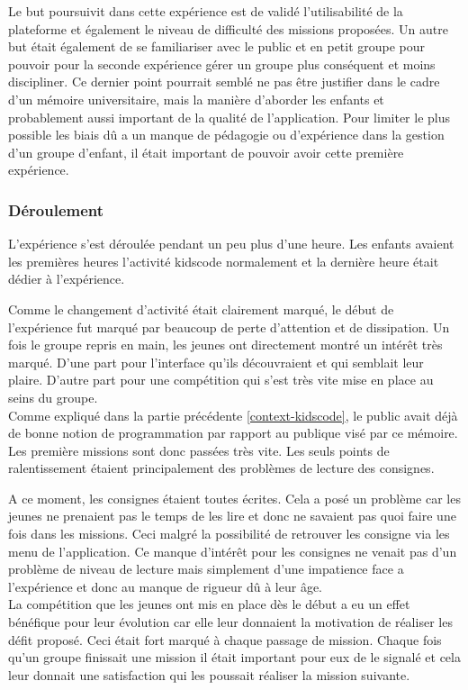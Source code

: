 Le but poursuivit dans cette expérience est de validé l'utilisabilité de la plateforme et également le niveau de difficulté des missions proposées. Un autre but était également de se familiariser avec le public et en petit groupe pour pouvoir pour la seconde expérience gérer un groupe plus conséquent et moins discipliner.
Ce dernier point pourrait semblé ne pas être justifier dans le cadre d'un mémoire universitaire, mais la manière d'aborder les enfants et probablement aussi important de la qualité de l'application. Pour limiter le plus possible les biais dû a un manque de pédagogie ou d'expérience dans la gestion d'un groupe d'enfant, il était important de pouvoir avoir cette première expérience.
\subsubsection{Déroulement}
L'expérience s'est déroulée pendant un peu plus d'une heure. Les enfants avaient les premières heures l'activité kidscode normalement et la dernière heure était dédier à l'expérience. 

Comme le changement d'activité était clairement marqué, le début de l'expérience fut marqué par beaucoup de perte d'attention et de dissipation. Un fois le groupe repris en main, les jeunes ont directement montré un intérêt très marqué. D'une part pour l'interface qu'ils découvraient et qui semblait leur plaire. D'autre part pour une compétition qui s'est très vite mise en place au seins du groupe.\\

Comme expliqué dans la partie précédente \ref{context-kidscode}, le public avait déjà de bonne notion de programmation par rapport au publique visé par ce mémoire. Les première missions sont donc passées très vite. Les seuls points de ralentissement étaient principalement des problèmes de lecture des consignes. 

A ce moment, les consignes étaient toutes écrites. Cela a posé un problème car les jeunes ne prenaient pas le temps de les lire et donc ne savaient pas quoi faire une fois dans les missions. Ceci malgré la possibilité de retrouver les consigne via les menu de l'application. Ce manque d'intérêt pour les consignes ne venait pas d'un problème de niveau de lecture mais simplement d'une impatience face a l'expérience et donc au manque de rigueur dû à leur âge.\\

La compétition que les jeunes ont mis en place dès le début a eu un effet bénéfique pour leur évolution car elle leur donnaient la motivation de réaliser les défit proposé. Ceci était fort marqué à chaque passage de mission. Chaque fois qu'un groupe finissait une mission il était important pour eux de le signalé et cela leur donnait une satisfaction qui les poussait réaliser la mission suivante.\\ %

